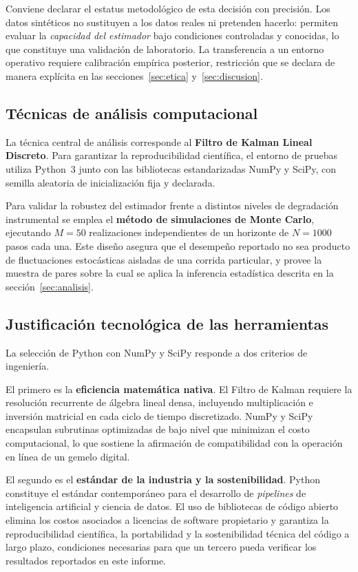 Conviene declarar el estatus metodológico de esta decisión con precisión. Los
datos sintéticos no sustituyen a los datos reales ni pretenden hacerlo: permiten
evaluar la \emph{capacidad del estimador} bajo condiciones controladas y
conocidas, lo que constituye una validación de laboratorio. La transferencia a
un entorno operativo requiere calibración empírica posterior, restricción que se
declara de manera explícita en las secciones~\ref{sec:etica}
y~\ref{sec:discusion}.

\subsection{Técnicas de análisis computacional}

La técnica central de análisis corresponde al \textbf{Filtro de Kalman Lineal
Discreto}. Para garantizar la reproducibilidad científica, el entorno de pruebas
utiliza Python~3 junto con las bibliotecas estandarizadas NumPy y SciPy, con
semilla aleatoria de inicialización fija y declarada.

Para validar la robustez del estimador frente a distintos niveles de degradación
instrumental se emplea el \textbf{método de simulaciones de Monte Carlo},
ejecutando $M = 50$ realizaciones independientes de un horizonte de $N = 1000$
pasos cada una. Este diseño asegura que el desempeño reportado no sea producto
de fluctuaciones estocásticas aisladas de una corrida particular, y provee la
muestra de pares sobre la cual se aplica la inferencia estadística descrita en
la sección~\ref{sec:analisis}.

\subsection{Justificación tecnológica de las herramientas}

La selección de Python con NumPy y SciPy responde a dos criterios de ingeniería.

El primero es la \textbf{eficiencia matemática nativa}. El Filtro de Kalman
requiere la resolución recurrente de álgebra lineal densa, incluyendo
multiplicación e inversión matricial en cada ciclo de tiempo discretizado. NumPy
y SciPy encapsulan subrutinas optimizadas de bajo nivel que minimizan el costo
computacional, lo que sostiene la afirmación de compatibilidad con la operación
en línea de un gemelo digital.

El segundo es el \textbf{estándar de la industria y la sostenibilidad}. Python
constituye el estándar contemporáneo para el desarrollo de \emph{pipelines} de
inteligencia artificial y ciencia de datos. El uso de bibliotecas de código
abierto elimina los costos asociados a licencias de software propietario y
garantiza la reproducibilidad científica, la portabilidad y la sostenibilidad
técnica del código a largo plazo, condiciones necesarias para que un tercero
pueda verificar los resultados reportados en este informe.
